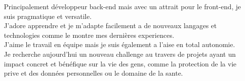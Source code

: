 \documentclass[8pt]{developercv} %
\begin{document}
\begin{minipage}[t]{0.5\textwidth} %
	\vspace{-0.5\baselineskip} %

	Principalement développeur back-end mais avec un attrait pour le front-end, je suis pragmatique et versatile.\\
	J'adore apprendre et je m'adapte facilement a de nouveaux langages et technologies comme le montre mes dernières experiences.\\
	J'aime le travail en équipe mais je suis également a l'aise en total autonomie.\\

	Je recherche aujourd'hui un nouveau challenge au travers de projets ayant un impact concret et bénéfique sur la vie des gens, comme la protection de la vie prive et des données personnelles ou le domaine de la sante.
\end{minipage}
\hfill %
\begin{minipage}[t]{0.45\textwidth} %
	\vspace{-1.5\baselineskip} %
	\begin{barchart}{5.5}
	\end{barchart}
\end{minipage}

\vfill %
\end{document}
